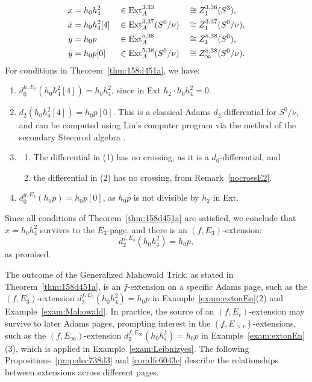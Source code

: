 \documentclass{amsart}
\numberwithin{equation}{section}
\begin{document}
\begin{example}
%
\begin{align*}
x & =h_0h_4^2 && \in \mathrm{Ext}_A^{3,33} && \cong Z_1^{3,36}(S^3),\\
\bar{x} & =h_0h_4^2[4] && \in \mathrm{Ext}_A^{3,37}(S^0/\nu) && \cong Z_1^{3,37}(S^0/\nu), \\
y & =h_0p && \in \mathrm{Ext}_A^{5,38} && \cong Z_1^{5,38}(S^0),\\
        \bar{y} & =h_0p[0] && \in \mathrm{Ext}_A^{5,38}(S^0/\nu) && \cong Z_\infty^{5,38}(S^0/\nu). 
  \end{align*}      
%
For conditions in Theorem~\ref{thm:158d451a}, we have:
\begin{enumerate}
      \item $d_0^{h, E_2}(h_0h_4^2[4]) = h_0h_4^2$, since in Ext $h_2 \cdot h_0h_4^2 = 0$.
      \item $d_2(h_0h_4^2[4]) = h_0p[0]$. This is a classical Adams $d_2$-differential for $S^0/\nu$, and can be computed using Lin's computer program via the method of the secondary Steenrod algebra \cite{BJ, Nassau, Chua}.
      \item 
      \begin{enumerate}
          \item The differential in (1) has no crossing, as it is a $d_0$-differential, and
          \item the differential in (2) has no crossing, from Remark~\ref{nocrossE2}. 
      \end{enumerate}
      \item 
      $d_0^{g, E_2} (h_0p) = h_0p[0]$, as $h_0p$ is not divisible by $h_2$ in Ext.
      \end{enumerate}
    Since all conditions of  Theorem~\ref{thm:158d451a} are  satisfied, we conclude that $x=h_0h_4^2$ survives to the $E_3$-page, and there is an $(f, E_3)$-extension:
        $$d_2^{f, E_3} (h_0h_4^2) = h_0 p,$$
        as promised.
        
\end{example}

The outcome of the Generalized Mahowald Trick, as stated in Theorem~\ref{thm:158d451a}, is an $f$-extension on a specific Adams page, such as the $(f, E_3)$-extension $d_2^{f, E_3} (h_0h_4^2) = h_0 p$ in Example~\ref{exam:extonEn}(2) and Example~\ref{exam:Mahowald}. In practice, the source of an $(f, E_r)$-extension may survive to later Adams pages, prompting interest in the $(f, E_{>r})$-extensions, such as the $(f, E_\infty)$-extension $d_2^{f, E_\infty} (h_0h_4^2) = h_0 p$ in Example~\ref{exam:extonEn}(3), which is applied in Example~\ref{exam:Leibnizyes}. The following Propositions~\ref{prop:dec738d3} and \ref{cor:dfc6043e} describe the relationships between extensions across different pages.
\end{document}
